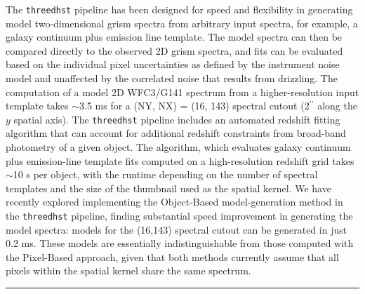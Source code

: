 \documentclass[12pt]{article}
\begin{document}
The \texttt{threedhst} pipeline has been designed for speed and flexibility in generating model two-dimensional grism spectra from arbitrary input spectra, for example, a galaxy continuum plus emission line template.  The model spectra can then be compared directly to the observed 2D grism spectra, and fits can be evaluated based on the individual pixel uncertainties as defined by the instrument noise model and unaffected by the correlated noise that results from drizzling.  The computation of a model 2D WFC3/G141 spectrum from a higher-resolution input template takes $\sim$3.5 ms for a (NY, NX) = (16, 143) spectral cutout (2$^{\prime\prime}$ along the $y$ spatial axis).  The \texttt{threedhst} pipeline includes an automated redshift fitting algorithm that can account for additional redshift constraints from broad-band photometry of a given object.  The algorithm, which evaluates galaxy continuum plus emission-line template fits computed on a high-resolution redshift grid takes $\sim$10 s per object, with the runtime depending on the number of spectral templates and the size of the thumbnail used as the spatial kernel.  We have recently explored implementing the Object-Based model-generation method in the \texttt{threedhst} pipeline, finding substantial speed improvement in generating the model spectra:  models for the (16,143) spectral cutout can be generated in just 0.2 ms.  These models are essentially indistinguishable from those computed with the Pixel-Based approach, given that both methods currently assume that all pixels within the spatial kernel share the same spectrum.  

\noindent\hfil\rule{0.5\textwidth}{.4pt}\hfil
\end{document}
